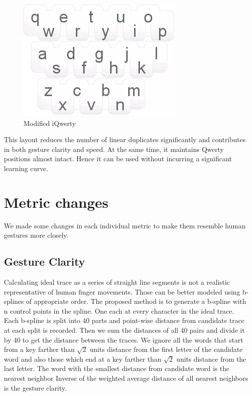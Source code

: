 \documentclass[MTech]{iitmdiss}
\begin{document}
\begin{figure}[h!]
	\centering
	\includegraphics[scale=1]{Images/iqmod}
	\caption{Modified iQwerty}
\end{figure}


This layout reduces the number of linear duplicates significantly and contributes in both gesture clarity and speed. At the same time, it maintains Qwerty positions almost intact. Hence it can be used without incurring a significant learning curve.

\section{Metric changes}
We made some changes in each individual metric to make them resemble human gestures more closely.
\subsection{Gesture Clarity}
Calculating ideal trace as a series of straight line segments is not a realistic representative of human finger movements. Those can be better modeled using b-splines of appropriate order.
The proposed method is to generate a b-spline with n control points in the spline. One each at every character in the ideal trace. Each b-spline is split into 40 parts and point-wise distance from candidate trace at each split is recorded. Then we sum the distances of all 40 pairs and divide it by 40 to get the distance between the traces. We ignore all the words that start from a key farther than $\sqrt{2}$ units distance from the first letter of the candidate word and also those which end at a key farther than $\sqrt{2}$ units distance from the last letter. The word with the smallest distance from candidate word is the nearest neighbor Inverse of the weighted average distance of all nearest neighbors is the gesture clarity.
\end{document}
